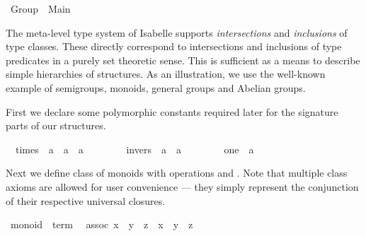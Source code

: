 %
\begin{isabellebody}%
\def\isabellecontext{Group}%
%
\ Group\ {\isacharequal}\ Main{\isacharcolon}%
\begin{isamarkuptext}%
\medskip\noindent The meta-level type system of Isabelle supports
 \emph{intersections} and \emph{inclusions} of type classes. These
 directly correspond to intersections and inclusions of type
 predicates in a purely set theoretic sense. This is sufficient as a
 means to describe simple hierarchies of structures.  As an
 illustration, we use the well-known example of semigroups, monoids,
 general groups and Abelian groups.%
\end{isamarkuptext}%
%
%
\begin{isamarkuptext}%
First we declare some polymorphic constants required later for the
 signature parts of our structures.%
\end{isamarkuptext}%
\isanewline
\ \ times\ {\isacharcolon}{\isacharcolon}\ {\isachardoublequote}{\isacharprime}a\ {\isasymRightarrow}\ {\isacharprime}a\ {\isasymRightarrow}\ {\isacharprime}a{\isachardoublequote}\ \ \ \ {\isacharparenleft}\ {\isachardoublequote}{\isasymodot}{\isachardoublequote}\ {}{}{\isacharparenright}\isanewline
\ \ invers\ {\isacharcolon}{\isacharcolon}\ {\isachardoublequote}{\isacharprime}a\ {\isasymRightarrow}\ {\isacharprime}a{\isachardoublequote}\ \ \ \ {\isacharparenleft}{\isachardoublequote}{\isacharparenleft}{\isacharunderscore}{\isasyminv}{\isacharparenright}{\isachardoublequote}\ {\isacharbrackleft}{}{}{}{}{\isacharbrackright}\ {}{}{}{\isacharparenright}\isanewline
\ \ one\ {\isacharcolon}{\isacharcolon}\ {\isacharprime}a\ \ \ \ {\isacharparenleft}{\isachardoublequote}{\isasymunit}{\isachardoublequote}{\isacharparenright}%
\begin{isamarkuptext}%
\noindent Next we define class  of monoids with
 operations \isa{{\isasymodot}} and \isa{{\isasymunit}}.  Note that multiple class
 axioms are allowed for user convenience --- they simply represent the
 conjunction of their respective universal closures.%
\end{isamarkuptext}%
\ monoid\ {\isasymsubseteq}\ {\isachardoublequote}term{\isachardoublequote}\isanewline
\ \ assoc{\isacharcolon}\ {\isachardoublequote}{\isacharparenleft}x\ {\isasymodot}\ y{\isacharparenright}\ {\isasymodot}\ z\ {\isacharequal}\ x\ {\isasymodot}\ {\isacharparenleft}y\ {\isasymodot}\ z{\isacharparenright}{\isachardoublequote}\isanewline

\end{isabellebody}
